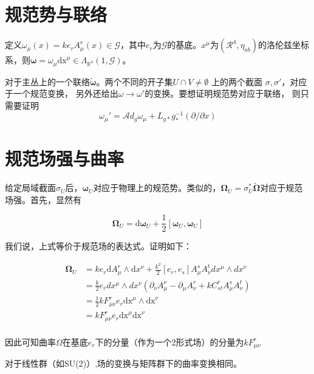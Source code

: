 \documentclass{ctexbook}
\begin{document}
\begin{e   quation}
\chapter{规范势与联络}

定义$\omega_\mu(x)=k e_r A^r_\mu(x)\in\mathscr{G}$，其中$e_r$为$\mathscr{G}$的基底。$x^\mu$为$\left(\mathscr{R}^4,\eta_{ab}\right)$的洛伦兹坐标系，则$\bm{\omega}=\omega_\mu\mathrm{dx}^\mu\in\Lambda_{\mathbb{R}^4}(1,\mathscr{G})$。

对于主丛上的一个联络$\tilde{\bm{\omega}}$。两个不同的开子集$U\cap V\neq\emptyset$ 上的两个截面 $\sigma,\sigma'$，对应于一个规范变换， 另外还给出$\omega\to\omega'$的变换。要想证明规范势对应于联络， 则只需要证明
\begin{equation}
    \omega_\mu'=\mathscr{A}d_{g}\omega_\mu+L_{g*}g^{-1}_*(\partial/\partial x)
\end{equation}

\chapter{规范场强与曲率}

给定局域截面$\sigma_U$后，$\bm{\omega}_U$对应于物理上的规范势。类似的，$\bm{\Omega}_U=\sigma_U^{*}\tilde{\bm{\Omega}}$对应于规范场强。首先，显然有

\begin{equation}
    \bm{\Omega}_U=\mathrm{d}\bm{\omega}_U+\frac{1}{2}[\bm{\omega}_U,\bm{\omega}_U]
\end{equation}

我们说，上式等价于规范场的表达式。证明如下：

\begin{equation}
\begin{split}
    \bm{\Omega}_U
    &=ke_r\mathrm{d}A_\mu^r\wedge\mathrm{d}x^\nu+\frac{k^2}{2}[e_r,e_s]A_\mu^s A_\nu^t dx^\mu\wedge dx^\nu\\
    &=\frac{k}{2}e_r dx^\mu\wedge dx^\nu(\partial_\nu A_\mu^\nu-\partial_\mu A_\nu^r+kC^r_{st}A^s_\mu A_\nu^t)\\
    &=\frac{1}{2}kF_{\mu\nu}^r e_r \mathrm{dx}^\mu\wedge\mathrm{dx}^\nu\\
    &=k F_{\mu\nu}^r e_r \mathrm{dx}^\mu\mathrm{dx}^\nu\\
\end{split}
\end{equation}


因此可知曲率$\Omega$在基底$e_r$下的分量（作为一个2形式场）的分量为$kF^{r}_{\mu\nu}$

对于线性群（如SU(2)）,场的变换与矩阵群下的曲率变换相同。



\end{e   quation}
\end{document}
